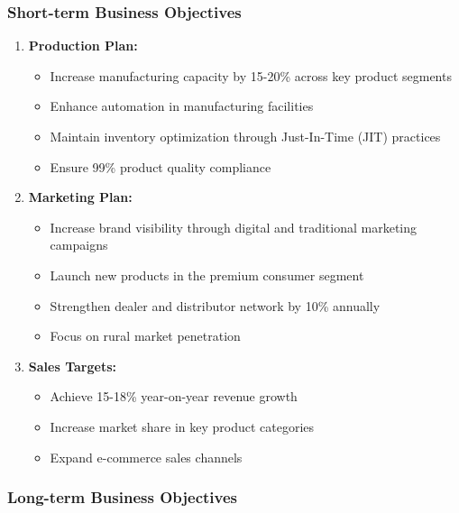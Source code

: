 \documentclass[12pt,a4paper]{article}
\begin{document}
\subsubsection{Short-term Business Objectives}

\begin{enumerate}[leftmargin=*]
    \item \textbf{Production Plan:}
    \begin{itemize}
        \item Increase manufacturing capacity by 15-20\% across key product segments
        \item Enhance automation in manufacturing facilities
        \item Maintain inventory optimization through Just-In-Time (JIT) practices
        \item Ensure 99\% product quality compliance
    \end{itemize}
    
    \item \textbf{Marketing Plan:}
    \begin{itemize}
        \item Increase brand visibility through digital and traditional marketing campaigns
        \item Launch new products in the premium consumer segment
        \item Strengthen dealer and distributor network by 10\% annually
        \item Focus on rural market penetration
    \end{itemize}
    
    \item \textbf{Sales Targets:}
    \begin{itemize}
        \item Achieve 15-18\% year-on-year revenue growth
        \item Increase market share in key product categories
        \item Expand e-commerce sales channels
    \end{itemize}
\end{enumerate}

\subsubsection{Long-term Business Objectives}
\end{document}
